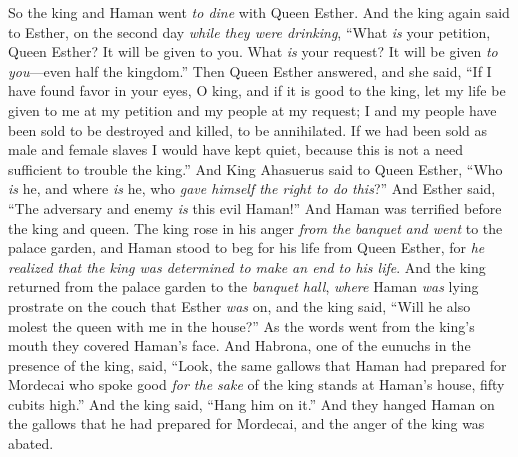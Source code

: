 \begin{biblechapter} %
 So the king and Haman went \textit{to dine} with Queen Esther.
\verse And the king again said to Esther, on the second day \textit{while they were drinking}, “What \textit{is} your petition, Queen Esther? It will be given to you. What \textit{is} your request? It will be given \textit{to you}—even half the kingdom.”
\verse Then Queen Esther answered, and she said, “If I have found favor in your eyes, O king, and if it is good to the king, let my life be given to me at my petition and my people at my request;
\verse I and my people have been sold to be destroyed and killed, to be annihilated. If we had been sold as male and female slaves I would have kept quiet, because this is not a need sufficient to trouble the king.”
\verse And King Ahasuerus said to Queen Esther, “Who \textit{is} he, and where \textit{is} he, who \textit{gave himself the right to do this}?”
\verse And Esther said, “The adversary and enemy \textit{is} this evil Haman!” And Haman was terrified before the king and queen.
 The king rose in his anger \textit{from the banquet} \textit{and went} to the palace garden, and Haman stood to beg for his life from Queen Esther, for \textit{he realized that the king was determined to make an end to his life}.
\verse And the king returned from the palace garden to the \textit{banquet hall}, \textit{where} Haman \textit{was} lying prostrate on the couch that Esther \textit{was} on, and the king said, “Will he also molest the queen with me in the house?” As the words went from the king’s mouth they covered Haman’s face.
\verse And Habrona, one of the eunuchs in the presence of the king, said, “Look, the same gallows that Haman had prepared for Mordecai who spoke good \textit{for the sake} of the king stands at Haman’s house, fifty cubits high.” And the king said, “Hang him on it.”
\verse And they hanged Haman on the gallows that he had prepared for Mordecai, and the anger of the king was abated.
\end{biblechapter}

